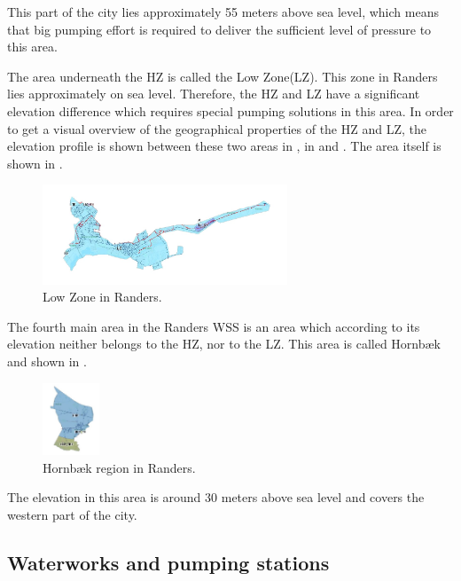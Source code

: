This part of the city lies approximately 55 meters above sea level, which means that big pumping effort is required to deliver the sufficient level of pressure to this area. 

The area underneath the HZ is called the Low Zone(LZ). This zone in Randers lies approximately on sea level. Therefore, the HZ and LZ have a significant elevation difference which requires special pumping solutions in this area. In order to get a visual overview of the geographical properties of the HZ and LZ, the elevation profile is shown between these two areas in , in  and . The area itself is shown in .

\begin{figure}[H]
\centering
\includegraphics[width=0.65\textwidth]{report/pictures/Lowzone_region}
\caption{Low Zone in Randers.}
\label{fig:lowzone_region}
\end{figure}

The fourth main area in the Randers WSS is an area which according to its elevation neither belongs to the HZ, nor to the LZ. This area is called Hornbæk and shown in .

\begin{figure}[H]
\centering
\includegraphics[width=0.15\textwidth]{report/pictures/Hornbaek_region}
\caption{Hornbæk region in Randers.}
\label{fig:hornbaek_region}
\end{figure}

The elevation in this area is around 30 meters above sea level and covers the western part of the city.  

\subsection{Waterworks and pumping stations}
\label{waterworks_and_pumping_stations}

